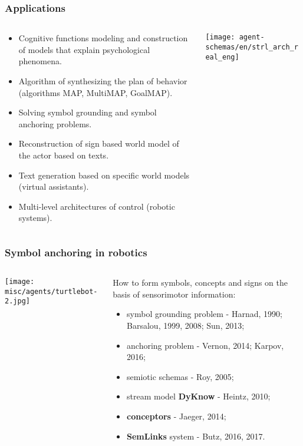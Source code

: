 \documentclass[default]{beamer}
\begin{document}
	\begin{frame}
		\frametitle{Applications}

		\footnotesize
		\begin{columns}
			\begin{column}{0.43\textwidth}
				\begin{itemize}
					\item Cognitive functions modeling and construction of models that explain psychological phenomena.
					\item Algorithm of synthesizing the plan of behavior (algorithms MAP, MultiMAP, GoalMAP).
					\item Solving symbol grounding and symbol anchoring problems.
					\item Reconstruction of sign based world model of the actor based on texts.
					\item Text generation based on specific world models (virtual assistants).
					\item Multi-level architectures of control (robotic systems).
				\end{itemize}
				
			\end{column}
			\begin{column}{0.57\textwidth}
				\texttt{[image: agent-schemas/en/strl\_arch\_real\_eng]}
			\end{column}
		\end{columns}
		\vspace{-5pt}
		\nocite{*}
		\printbibliography[keyword={strl}, resetnumbers=true]
	\end{frame}

	\begin{frame}
		\frametitle{Symbol anchoring in robotics}
		
		\begin{columns}
			\begin{column}{0.43\textwidth}
				\texttt{[image: misc/agents/turtlebot-2.jpg]}
				
				
			\end{column}
			\begin{column}{0.57\textwidth}
				How to form symbols, concepts and signs on the basis of sensorimotor information:
				\begin{itemize}
					\item symbol grounding problem - Harnad, 1990; Barsalou, 1999, 2008; Sun, 2013;
					\item anchoring problem - Vernon, 2014; Karpov, 2016;
					\item semiotic schemas - Roy, 2005;
					\item stream model \textbf{DyKnow} - Heintz, 2010;
					\item \textbf{conceptors} - Jaeger, 2014;
					\item \textbf{SemLinks} system - Butz, 2016, 2017.
				\end{itemize}
			\end{column}
		\end{columns}
	\end{frame}
\end{document}
